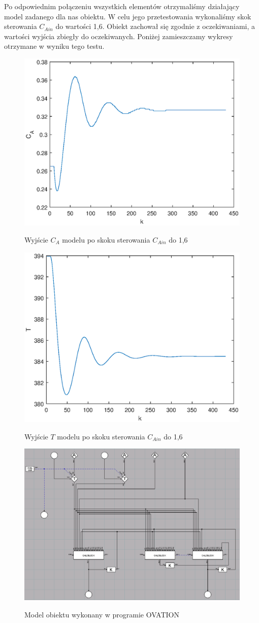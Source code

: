 Po odpowiednim połączeniu wszystkich elementów otrzymaliśmy działający model zadanego dla nas obiektu. W celu jego przetestowania wykonaliśmy skok sterowania $C_{Ain}$ do wartości 1,6. Obiekt zachował się zgodnie z oczekiwaniami, a wartości wyjścia zbiegły do oczekiwanych. Poniżej zamieszczamy wykresy otrzymane w wyniku tego testu.

\begin{figure}[h!]
	\centering
	\includegraphics[width=.8\linewidth]{img/model1.eps}
	\label{ch1:model1}
	\caption{Wyjście $C_A$ modelu po skoku sterowania $C_{Ain}$ do 1,6}
\end{figure}

\begin{figure}[h!]
\centering
\includegraphics[width=.8\linewidth]{img/model2.eps}
\label{ch1:model2}
\caption{Wyjście $T$ modelu po skoku sterowania $C_{Ain}$ do 1,6}
\end{figure}

\begin{figure}[h!]
	\centering
	\includegraphics[width=\linewidth]{img/MODEL.png}
	\label{ch1:model}
	\caption{Model obiektu wykonany w programie OVATION}
\end{figure}